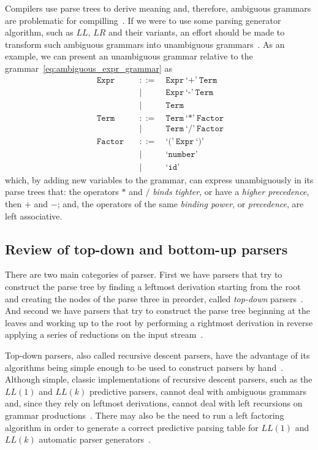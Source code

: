 \documentclass[
  oneside,
  english,
  coorientadorbanca,
  noabntexcite
]{ufsc-thesis-rn46-2019}
\def\bnfdef{::=}
\newcommand{\code}[1]{\texttt{#1}}
\newcommand{\bnfvar}[1]{\ \bnfvars{#1}}
\newcommand{\bnfvars}[1]{\code{#1}}
\newcommand{\bnfter}[1]{\ \bnfters{#1}}
\newcommand{\bnfters}[1]{\textrm{`}\code{#1}\textrm{'}}
\newcommand{\bnfprod}[2]{\bnfvars{#1} &\ &\bnfdef& #2}
\newcommand{\bnfmore}[1]{ && \mid{} & #1}
\begin{document}
Compilers use parse trees to derive meaning and, therefore, ambiguous grammars are problematic for compilling~\cite{appel2003modern}.
If we were to use some parsing generator algorithm, such as $LL$, $LR$ and their variants, an effort should be made to transform such ambiguous grammars into unambiguous grammars~\cite{appel2003modern}.
As an example, we can present an unambiguous grammar relative to the grammar~\eqref{eq:ambiguous_expr_grammar} as
\begin{equation}~\label{eq:unambiguous_expr_grammar}
  \begin{alignedat}{2}
    \bnfprod{Expr}{\bnfvar{Expr} \bnfter{+} \bnfvar{Term}} \\
    \bnfmore{\bnfvar{Expr}\bnfter{-}\bnfvar{Term}} \\
    \bnfmore{\bnfvar{Term}} \\
    \bnfprod{Term}{\bnfvar{Term} \bnfter{*} \bnfvar{Factor}} \\
    \bnfmore{\bnfvar{Term}\bnfter{/}\bnfvar{Factor}} \\
    \bnfprod{Factor}{\bnfter{(}\bnfvar{Expr}\bnfter{)}} \\
    \bnfmore{\bnfter{number}} \\
    \bnfmore{\bnfter{id}}
  \end{alignedat}
\end{equation}
which, by adding new variables to the grammar, can express unambiguously in its parse trees that: the operators $*$ and $/$ \textit{binds tighter}, or have a \textit{higher precedence}, then $+$ and $-$; and, the operators of the same \textit{binding power}, or \textit{precedence}, are left associative.

\subsection{Review of top-down and bottom-up parsers}
There are two main categories of parser.
First we have parsers that try to construct the parse tree by finding a leftmost derivation starting from the root and creating the nodes of the parse three in preorder, called \textit{top-down} parsers~\cite{Aho:2006:CPT:1177220}.
And second we have parsers that try to construct the parse tree beginning at the leaves and working up to the root by performing a rightmost derivation in reverse applying a series of reductions on the input stream~\cite{Aho:2006:CPT:1177220}.

Top-down parsers, also called recursive descent parsers, have the advantage of its algorithms being simple enough to be used to construct parsers by hand~\cite{appel2003modern}.
Although simple, classic implementations of recursive descent parsers, such as the $LL(1)$ and $LL(k)$ predictive parsers, cannot deal with ambiguous grammars and, since they rely on leftmost derivations, cannot deal with left recursions on grammar productions~\cite{Aho:2006:CPT:1177220}.
There may also be the need to run a left factoring algorithm in order to generate a correct predictive parsing table for $LL(1)$ and $LL(k)$ automatic parser generators~\cite{Aho:2006:CPT:1177220}.
\end{document}
